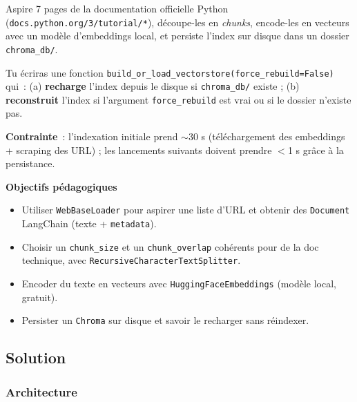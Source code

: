 \documentclass[11pt,a4paper]{article}
\begin{document}
\begin{tcolorbox}[title=Exercice 1. Construire un index Chroma persistant]
Aspire 7 pages de la documentation officielle Python
(\texttt{docs.python.org/3/tutorial/*}), découpe-les en \emph{chunks},
encode-les en vecteurs avec un modèle d'embeddings local, et persiste
l'index sur disque dans un dossier \texttt{chroma\_db/}.

Tu écriras une fonction \texttt{build\_or\_load\_vectorstore(force\_rebuild=False)}
qui~: (a) \textbf{recharge} l'index depuis le disque si \texttt{chroma\_db/}
existe ; (b) \textbf{reconstruit} l'index si l'argument \texttt{force\_rebuild}
est vrai ou si le dossier n'existe pas.

\textbf{Contrainte}~: l'indexation initiale prend $\sim$30 s (téléchargement
des embeddings + scraping des URL) ; les lancements suivants doivent
prendre $<$1 s grâce à la persistance.

\bigskip
\noindent\textbf{Objectifs pédagogiques}
\begin{itemize}[leftmargin=*]
  \item Utiliser \texttt{WebBaseLoader} pour aspirer une liste d'URL et
        obtenir des \texttt{Document} LangChain (texte + \texttt{metadata}).
  \item Choisir un \texttt{chunk\_size} et un \texttt{chunk\_overlap}
        cohérents pour de la doc technique, avec
        \texttt{RecursiveCharacterTextSplitter}.
  \item Encoder du texte en vecteurs avec
        \texttt{HuggingFaceEmbeddings} (modèle local, gratuit).
  \item Persister un \texttt{Chroma} sur disque et savoir le recharger
        sans réindexer.
\end{itemize}
\end{tcolorbox}

\subsection{Solution}

\subsubsection{Architecture}
\end{document}
